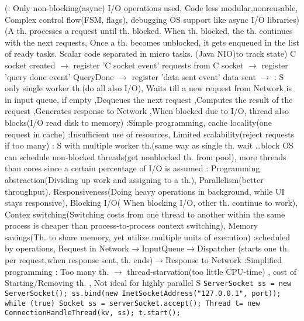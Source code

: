 (\btext{--}:
Only non‐blocking(async) I/O operations used,
Code less modular,nonreusable,
Complex control flow(FSM, flags), debugging
OS support like async I/O libraries)
(A th. processes a request until th. blocked.
When th. blocked, the th. continues with the next requests,
Once a th. becomes unblocked, it gets enqueued in the list of ready tasks.
Scalar code separated in micro tasks.
(Java NIO)to track state)
C socket created $\rightarrow$  register 'C socket event'
\textbar
requests from C socket $\rightarrow$  register 'query done event'
\textbar
QueryDone $\rightarrow$  register 'data sent event'
\textbar
data sent $\rightarrow$  
\textbar
{}:
S only single worker th.(do all also I/O), 
Waits till a new request from Network is in input queue, if empty
,Dequeues the next request
,Computes the result of the request
,Generates response to Network
,When blocked due to I/O, thread also blocks(I/O read disk to memory)
\btext{++}:Simple programming, cache locality(one request in cache)
\btext{--}:Insufficient use of resources, Limited scalability(reject requests if too many)
\textbar
{}:
S with multiple worker th.(same way as single th. wait \dots block
OS can schedule non‐blocked threads(get nonblocked th. from pool),
more threads than cores since a certain percentage of I/O is assumed
\btext{++}:
Programming abstraction(Dividing up work and assigning to a th.),
Parallelism(better throughput),
Responsiveness(Doing heavy operations in background, while UI stays responsive),
Blocking I/O( When blocking I/O, other th. continue to work),
Contex switching(Switching costs from one thread to another within the same process is cheaper than process‐to‐process context switching),
Memory savings(Th. to share memory, yet utilize multiple units of execution)
\textbar
{}:scheduled by operations,
Request in Network$\rightarrow$InputQueue$\rightarrow$Dispatcher
(starts one th. per request,when response sent, th. ends)$\rightarrow$Response to Network
\btext{++}:Simplified programming 
\btext{--}: Too many th. $\rightarrow$ thread‐starvation(too little CPU‐time)
, cost of Starting/Removing th. 
, Not ideal for highly parallel S
\lstinline{ServerSocket ss = new ServerSocket(); ss.bind(new InetSocketAddress("127.0.0.1", port)); while (true) Socket ss = serverSocket.accept(); Thread t= new ConnectionHandleThread(kv, ss); t.start();}
